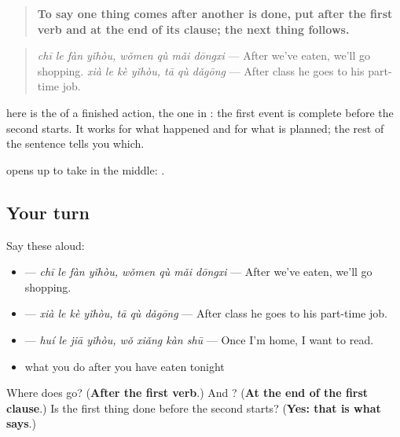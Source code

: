 \begin{grammarlens}[title={Grammar Lens: \zh{了} … \zh{以后}, after doing something}]
\begin{quote}
\textbf{To say one thing comes after another is done, put  after the first verb and  at the end of its clause; the next thing follows.}
\end{quote}

\begin{quote}
\textbf{ } \emph{chī le fàn yǐhòu, wǒmen qù mǎi dōngxi} — After we've eaten, we'll go shopping. \textbf{ } \emph{xià le kè yǐhòu, tā qù dǎgōng} — After class he goes to his part-time job.
\end{quote}

 here is the  of a finished action, the one in : the first event is complete before the second starts. It works for what happened and for what is planned; the rest of the sentence tells you which.

 opens up to take  in the middle: .
\end{grammarlens}

\subsection*{Your turn}
Say these aloud:

\begin{itemize}
\raggedright
  \item {}  — \emph{chī le fàn yǐhòu, wǒmen qù mǎi dōngxi} — After we've eaten, we'll go shopping.
  \item {}  — \emph{xià le kè yǐhòu, tā qù dǎgōng} — After class he goes to his part-time job.
  \item {}  — \emph{huí le jiā yǐhòu, wǒ xiǎng kàn shū} — Once I'm home, I want to read.
  \item what you do after you have eaten tonight
\end{itemize}

\begin{tcolorbox}[breakable,colback=teal!4,colframe=teal!35!black,title={Before you move on}]
Where does  go? (\textbf{After the first verb}.) And ? (\textbf{At the end of the first clause}.) Is the first thing done before the second starts? (\textbf{Yes: that is what  says}.)
\end{tcolorbox}
